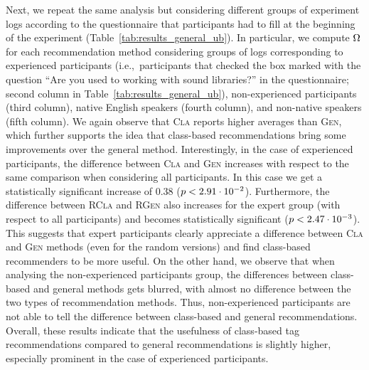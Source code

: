 Next, we repeat the same analysis but considering different groups of experiment logs according to the questionnaire that participants had to fill at the beginning of the experiment (Table~\ref{tab:results_general_ub}). In particular, we compute $\Omega$ for each recommendation method considering groups of logs corresponding to experienced participants (i.e.,~participants that checked the box marked with the question ``Are you used to working with sound libraries?'' in the questionnaire; second column in Table~\ref{tab:results_general_ub}), non-experienced participants (third column),  native English speakers (fourth column), and non-native speakers (fifth column). We again observe that \textsc{Cla} reports higher averages than \textsc{Gen}, which further supports the idea that class-based recommendations bring some improvements over the general method. Interestingly, in the case of experienced participants, the difference between \textsc{Cla} and \textsc{Gen} increases with respect to the same comparison when considering all participants. In this case we get a statistically significant increase of 0.38 ($p < 2.91\cdot 10^{-2}$). Furthermore, the difference between \textsc{RCla} and \textsc{RGen} also increases for the expert group (with respect to all participants) and becomes statistically significant ($p < 2.47\cdot 10^{-3}$). This suggests that expert participants clearly appreciate a difference between \textsc{Cla} and \textsc{Gen} methods (even for the random versions) and find class-based recommenders to be more useful. On the other hand, we observe that when analysing the non-experienced participants group, the differences between class-based and general methods gets blurred, with almost no difference between the two types of recommendation methods. Thus, non-experienced participants are not able to tell the difference between class-based and general recommendations. Overall, these results indicate that the usefulness of class-based tag recommendations compared to general recommendations is slightly higher, especially prominent in the case of experienced participants.

